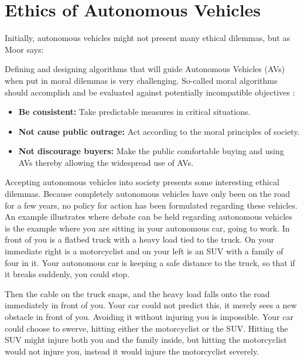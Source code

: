 \chapter{Ethics of Autonomous Vehicles}

Initially, autonomous vehicles might not present many ethical dilemmas, but as Moor says: 

\begin{quote}	
	 \cite{moor1985computer}
\end{quote}

\noindent Defining and designing algorithms that will guide Autonomous Vehicles (AVs) when put in moral dilemmas is very challenging. So-called moral algorithms should accomplish and be evaluated against potentially incompatible objectives \cite{10.2307/2027067}:

\begin{itemize}
	\item \textbf{Be consistent:} Take predictable measures in critical situations.
	\item \textbf{Not cause public outrage:} Act according to the moral principles of society.
	\item \textbf{Not discourage buyers:} Make the public comfortable buying and using AVs thereby allowing the widespread use of AVs. 
\end{itemize}

\newpar Accepting autonomous vehicles into society presents some interesting ethical dilemmas. Because completely autonomous vehicles have only been on the road for a few years, no policy for action has been formulated regarding these vehicles. An example illustrates where debate can be held regarding autonomous vehicles is the example where you are sitting in your autonomous car, going to work. In front of you is a flatbed truck with a heavy load tied to the truck. On your immediate right is a motorcyclist and on your left is an SUV with a family of four in it. Your autonomous car is keeping a safe distance to the truck, so that if it breaks suddenly, you could stop. 

Then the cable on the truck snaps, and the heavy load falls onto the road immediately in front of you. Your car could not predict this, it merely sees a new obstacle in front of you. Avoiding it without injuring you is impossible. Your car could choose to swerve, hitting either the motorcyclist or the SUV. Hitting the SUV might injure both you and the family inside, but hitting the motorcyclist would not injure you, instead it would injure the motorcyclist severely.

